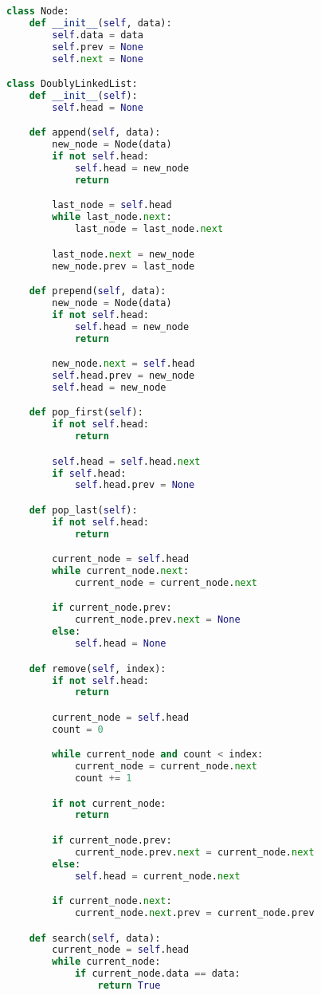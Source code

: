 \begin{lstlisting}[language=Python]
class Node:
    def __init__(self, data):
        self.data = data
        self.prev = None
        self.next = None

class DoublyLinkedList:
    def __init__(self):
        self.head = None

    def append(self, data):
        new_node = Node(data)
        if not self.head:
            self.head = new_node
            return

        last_node = self.head
        while last_node.next:
            last_node = last_node.next

        last_node.next = new_node
        new_node.prev = last_node

    def prepend(self, data):
        new_node = Node(data)
        if not self.head:
            self.head = new_node
            return

        new_node.next = self.head
        self.head.prev = new_node
        self.head = new_node

    def pop_first(self):
        if not self.head:
            return

        self.head = self.head.next
        if self.head:
            self.head.prev = None

    def pop_last(self):
        if not self.head:
            return

        current_node = self.head
        while current_node.next:
            current_node = current_node.next

        if current_node.prev:
            current_node.prev.next = None
        else:
            self.head = None

    def remove(self, index):
        if not self.head:
            return

        current_node = self.head
        count = 0

        while current_node and count < index:
            current_node = current_node.next
            count += 1

        if not current_node:
            return

        if current_node.prev:
            current_node.prev.next = current_node.next
        else:
            self.head = current_node.next

        if current_node.next:
            current_node.next.prev = current_node.prev

    def search(self, data):
        current_node = self.head
        while current_node:
            if current_node.data == data:
                return True


\end{lstlisting}
